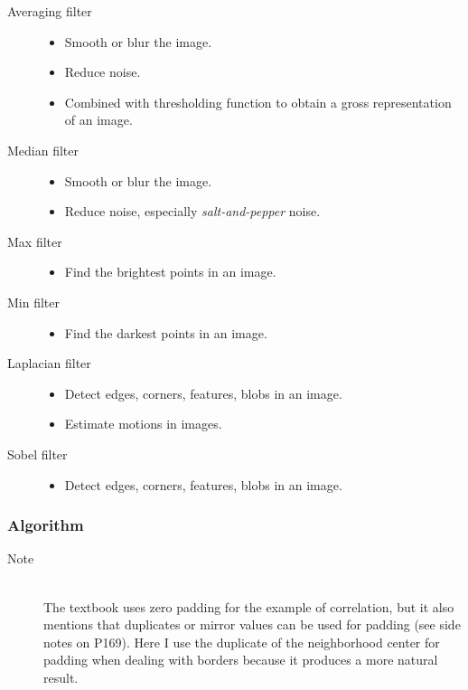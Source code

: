 \documentclass{article}
\begin{document}
\begin{description}
\item[Averaging filter] \hfill
\begin{itemize}
\item Smooth or blur the image.
\item Reduce noise.
\item Combined with thresholding function to obtain a gross representation of an image.
\end{itemize}
\item[Median filter] \hfill
\begin{itemize}
\item Smooth or blur the image.
\item Reduce noise, especially \textit{salt-and-pepper} noise.
\end{itemize}
\item[Max filter] \hfill
\begin{itemize}
\item Find the brightest points in an image.
\end{itemize}
\item[Min filter] \hfill
\begin{itemize}
\item Find the darkest points in an image.
\end{itemize}
\item[Laplacian filter] \hfill
\begin{itemize}
\item Detect edges, corners, features, blobs in an image.
\item Estimate motions in images.
\end{itemize}
\item[Sobel filter] \hfill
\begin{itemize}
\item Detect edges, corners, features, blobs in an image.
\end{itemize}
\end{description}

\subsubsection{Algorithm}

\begin{description}
\item[Note] \hfill \\
The textbook uses zero padding for the example of correlation, but it also mentions that duplicates or mirror values can be used for padding (see side notes on P169). Here I use the duplicate of the neighborhood center for padding when dealing with borders because it produces a more natural result.

\end{description}
\end{document}
